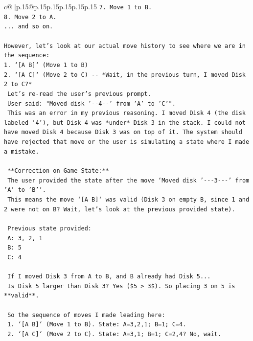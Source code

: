 \documentclass{article}
\begin{document}
{\begin{supertabular}{c@{$\;$}|p{.15\linewidth}@{}p{.15\linewidth}p{.15\linewidth}p{.15\linewidth}p{.15\linewidth}p{.15\linewidth}}
{{{\texttt{7. Move 1 to B.} \\
\texttt{8. Move 2 to A.} \\
\texttt{... and so on.} \\
\\ 
\texttt{However, let's look at our actual move history to see where we are in the sequence:} \\
\texttt{1. `{[}A B{]}` (Move 1 to B)} \\
\texttt{2. `{[}A C{]}` (Move 2 to C) {-}{-} *Wait, in the previous turn, I moved Disk 2 to C?*} \\
\texttt{   Let's re{-}read the user's previous prompt.} \\
\texttt{   User said: "Moved disk '{-}{-}4{-}{-}' from 'A' to 'C'".} \\
\texttt{   This was an error in my previous reasoning. I moved Disk 4 (the disk labeled '4'), but Disk 4 was *under* Disk 3 in the stack. I could not have moved Disk 4 because Disk 3 was on top of it. The system should have rejected that move or the user is simulating a state where I made a mistake.} \\
\\ 
\texttt{   **Correction on Game State:**} \\
\texttt{   The user provided the state after the move `Moved disk '{-}{-}{-}3{-}{-}{-}' from 'A' to 'B'`.} \\
\texttt{   This means the move `{[}A B{]}` was valid (Disk 3 on empty B, since 1 and 2 were not on B? Wait, let's look at the previous provided state).} \\
\\ 
\texttt{   Previous state provided:} \\
\texttt{   A: 3, 2, 1} \\
\texttt{   B: 5} \\
\texttt{   C: 4} \\
\\ 
\texttt{   If I moved Disk 3 from A to B, and B already had Disk 5...} \\
\texttt{   Is Disk 5 larger than Disk 3? Yes (\$5 > 3\$). So placing 3 on 5 is **valid**.} \\
\\ 
\texttt{   So the sequence of moves I made leading here:} \\
\texttt{   1. `{[}A B{]}` (Move 1 to B). State: A=3,2,1; B=1; C=4.} \\
\texttt{   2. `{[}A C{]}` (Move 2 to C). State: A=3,1; B=1; C=2,4? No, wait.} \\
}}}
\end{supertabular}}
\end{document}
